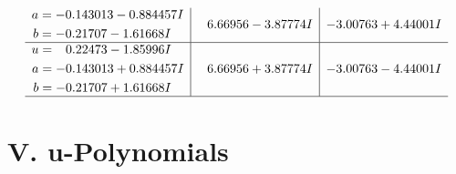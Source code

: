 \documentclass[1p]{elsarticle_modified}
\theoremstyle{definition}
\begin{document}
$$\begin{array}{c|c|c}
\begin{aligned}
a &= -0.143013 - 0.884457 I \\
b &= -0.21707 - 1.61668 I\end{aligned}
 & \phantom{-}6.66956 - 3.87774 I & -3.00763 + 4.44001 I \\ \hline\begin{aligned}
u &= \phantom{-}0.22473 - 1.85996 I \\
a &= -0.143013 + 0.884457 I \\
b &= -0.21707 + 1.61668 I\end{aligned}
 & \phantom{-}6.66956 + 3.87774 I & -3.00763 - 4.44001 I\\
 \hline 
 \end{array}$$\newpage
\newpage\renewcommand{\arraystretch}{1}
\centering \section*{ V. u-Polynomials}
\end{document}
